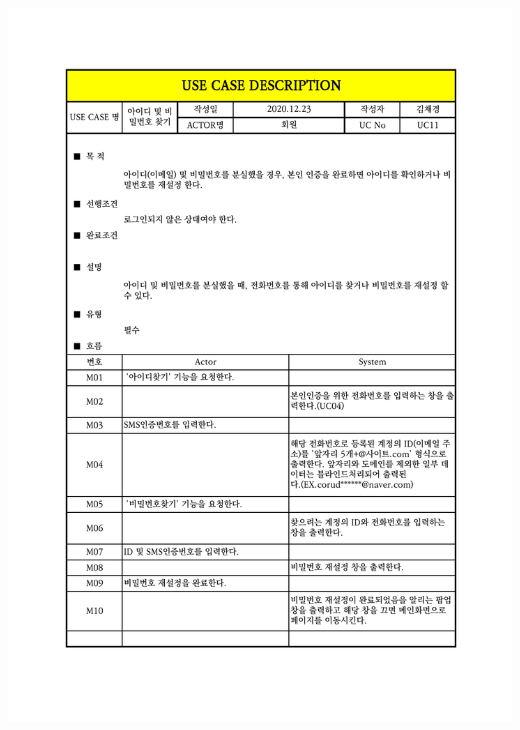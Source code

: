 {{{{{{{{{{{{\includegraphics[width=1.1\textwidth]{./Figure/Design/Display/usecase/011.pdf} \\
}}}}}}}}}}}}
